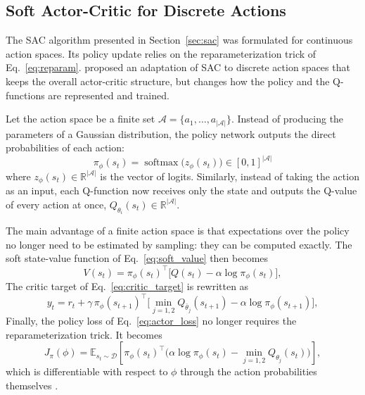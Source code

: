 \documentclass[preprint,10pt]{elsarticle}
\begin{document}
\subsection{Soft Actor-Critic for Discrete Actions}
\label{sec:discrete_sac}

The SAC algorithm presented in Section~\ref{sec:sac} was formulated for continuous action spaces. Its policy update relies on the reparameterization trick of Eq.~\eqref{eq:reparam}. \citet{christodoulou2019soft} proposed an adaptation of SAC to discrete action spaces that keeps the overall actor-critic structure, but changes how the policy and the Q-functions are represented and trained. 

Let the action space be a finite set $\mathcal{A} = \{a_1, \dots, a_{|\mathcal{A}|}\}$. Instead of producing the parameters of a Gaussian distribution, the policy network outputs the direct probabilities of each action:
\begin{equation}
    \pi_\phi(s_t) = \operatorname{softmax}\big(z_\phi(s_t)\big) \in [0, 1]^{|\mathcal{A}|}
    \label{eq:discrete_policy}
\end{equation}
where $z_\phi(s_t) \in \mathbb{R}^{|\mathcal{A}|}$ is the vector of logits. Similarly, instead of taking the action as an input, each Q-function now receives only the state and outputs the Q-value of every action at once, $Q_{\theta_i}(s_t) \in \mathbb{R}^{|\mathcal{A}|}$.

The main advantage of a finite action space is that expectations over the policy no longer need to be estimated by sampling: they can be computed exactly. The soft state-value function of Eq.~\eqref{eq:soft_value} then becomes
\begin{equation}
    V(s_t) = \pi_\phi(s_t)^{\top} \Big[ Q(s_t) - \alpha \log \pi_\phi(s_t) \Big],
    \label{eq:discrete_value}
\end{equation}
The critic target of Eq.~\eqref{eq:critic_target} is rewritten as
\begin{equation}
    y_t = r_t + \gamma \, \pi_\phi(s_{t+1})^{\top} \Big[ \min_{j=1,2} Q_{\bar{\theta}_j}(s_{t+1}) - \alpha \log \pi_\phi(s_{t+1}) \Big],
    \label{eq:discrete_critic_target}
\end{equation}
Finally, the policy loss of Eq.~\eqref{eq:actor_loss} no longer requires the reparameterization trick. It becomes
\begin{equation}
    J_\pi(\phi) = \mathbb{E}_{s_t \sim \mathcal{D}}\left[ \pi_\phi(s_t)^{\top} \Big( \alpha \log \pi_\phi(s_t) - \min_{j=1,2} Q_{\theta_j}(s_t) \Big) \right],
    \label{eq:discrete_actor_loss}
\end{equation}
which is differentiable with respect to $\phi$ through the action probabilities themselves \citep{christodoulou2019soft}. 
\end{document}
